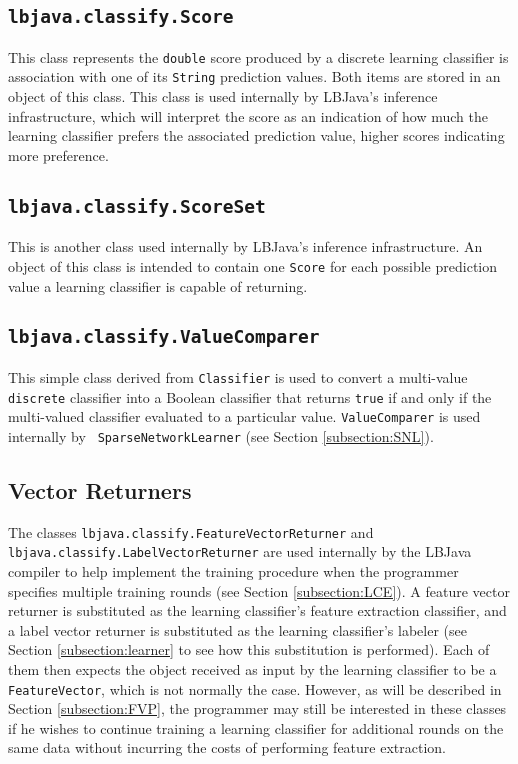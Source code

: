 \subsection{{\tt lbjava.classify.Score}}
This class represents the {\tt double} score produced by a discrete learning
classifier is association with one of its {\tt String} prediction values.
Both items are stored in an object of this class.  This class is used
internally by LBJava's inference infrastructure, which will interpret the score
as an indication of how much the learning classifier prefers the associated
prediction value, higher scores indicating more preference.

\subsection{{\tt lbjava.classify.ScoreSet}} \label{subsection:scoreSet}
This is another class used internally by LBJava's inference infrastructure.  An
object of this class is intended to contain one {\tt Score} for each possible
prediction value a learning classifier is capable of returning.

\subsection{{\tt lbjava.classify.ValueComparer}}
This simple class derived from {\tt Classifier} is used to convert a
multi-value {\tt discrete} classifier into a Boolean classifier that returns
{\tt true} if and only if the multi-valued classifier evaluated to a
particular value.  {\tt ValueComparer} is used internally by {\tt
SparseNetworkLearner} (see Section \ref{subsection:SNL}).

\subsection{Vector Returners} \label{subsection:vectorReturners}
The classes {\tt lbjava.classify.FeatureVectorReturner} and \\
{\tt lbjava.classify.LabelVectorReturner} are used internally by the LBJava
compiler to help implement the training procedure when the programmer
specifies multiple training rounds (see Section \ref{subsection:LCE}).  A
feature vector returner is substituted as the learning classifier's feature
extraction classifier, and a label vector returner is substituted as the
learning classifier's labeler (see Section \ref{subsection:learner} to see how
this substitution is performed).  Each of them then expects the object
received as input by the learning classifier to be a {\tt FeatureVector},
which is not normally the case.  However, as will be described in Section
\ref{subsection:FVP}, the programmer may still be interested in these classes
if he wishes to continue training a learning classifier for additional rounds
on the same data without incurring the costs of performing feature extraction.


